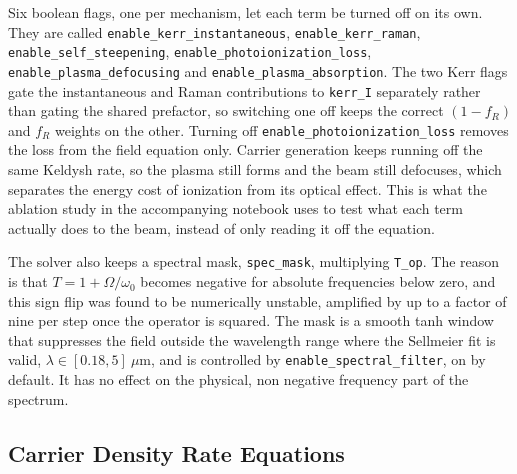 Six boolean flags, one per mechanism, let each term be turned off on its own. They are called \texttt{enable\_kerr\_instantaneous}, \texttt{enable\_kerr\_raman}, \texttt{enable\_self\_steepening}, \texttt{enable\_photoionization\_loss}, \texttt{enable\_plasma\_defocusing} and \texttt{enable\_plasma\_absorption}. The two Kerr flags gate the instantaneous and Raman contributions to \texttt{kerr\_I} separately rather than gating the shared prefactor, so switching one off keeps the correct $(1-f_R)$ and $f_R$ weights on the other. Turning off \texttt{enable\_photoionization\_loss} removes the loss from the field equation only. Carrier generation keeps running off the same Keldysh rate, so the plasma still forms and the beam still defocuses, which separates the energy cost of ionization from its optical effect. This is what the ablation study in the accompanying notebook uses to test what each term actually does to the beam, instead of only reading it off the equation.

The solver also keeps a spectral mask, \texttt{spec\_mask}, multiplying \texttt{T\_op}. The reason is that $T=1+\Omega/\omega_0$ becomes negative for absolute frequencies below zero, and this sign flip was found to be numerically unstable, amplified by up to a factor of nine per step once the operator is squared. The mask is a smooth tanh window that suppresses the field outside the wavelength range where the Sellmeier fit is valid, $\lambda\in[0.18,5]\ \mu\text{m}$, and is controlled by \texttt{enable\_spectral\_filter}, on by default. It has no effect on the physical, non negative frequency part of the spectrum.

\subsection{Carrier Density Rate Equations}

